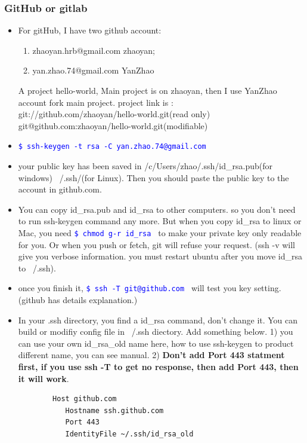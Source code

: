 \documentclass[a4paper,12pt,twoside]{book}
\newcommand{\linuxcommand}[1]{\texttt{\textcolor{blue}{\$ #1 \Pisymbol{psy}{191}}}}
\begin{document}
\begin{itemize}
\begin{itemize}
\begin{itemize}
   \end{itemize}

\subsubsection{GitHub or gitlab}
\begin{itemize}
\item For gitHub, I have two github account:
\begin{enumerate}
  \item zhaoyan.hrb@gmail.com  zhaoyan;
  \item yan.zhao.74@gmail.com YanZhao
\end{enumerate}
A project hello-world, Main project is on zhaoyan, then I use YanZhao account fork main project. project link is : \\
git://github.com/zhaoyan/hello-world.git(read only) \\
git@github.com:zhaoyan/hello-world.git(modifiable)


\item \linuxcommand{ssh-keygen -t rsa -C yan.zhao.74@gmail.com} \\
    \item your public key has been saved in /c/Users/zhao/.ssh/id\_rsa.pub(for windows) ~/.ssh/(for Linux). Then you should paste the public key to the account in github.com.  
        	
   \item You can copy id\_rsa.pub and id\_rsa to other computers. so you don't need to run ssh-keygen command any more. But when you copy id\_rsa to linux or Mac, you need \linuxcommand{chmod g-r id\_rsa} to make your private key only readable for you. Or when you push or fetch, git will refuse your request.  (ssh -v will give you verbose information. you must restart ubuntu after you move id\_rsa to ~/.ssh).


    \item once you finish it, \linuxcommand{ssh -T git@github.com} will test you key setting. (github has details explanation.)

\item In your .ssh directory, you find a id\_rsa command, don't change it. You can build or modifiy config file in ~/.ssh diectory. Add something below. 1) you can use your own id\_rsa\_old name here, how to use ssh-keygen to product different name, you can see manual. 2) \textbf{Don't add Port 443 statment first, if you use ssh -T to get no response, then add Port 443, then it will work}.
		\begin{verbatim}
		Host github.com
		   Hostname ssh.github.com
		   Port 443
		   IdentityFile ~/.ssh/id_rsa_old
		\end{verbatim}


\end{itemize}
\end{itemize}
\end{itemize}
\end{document}
